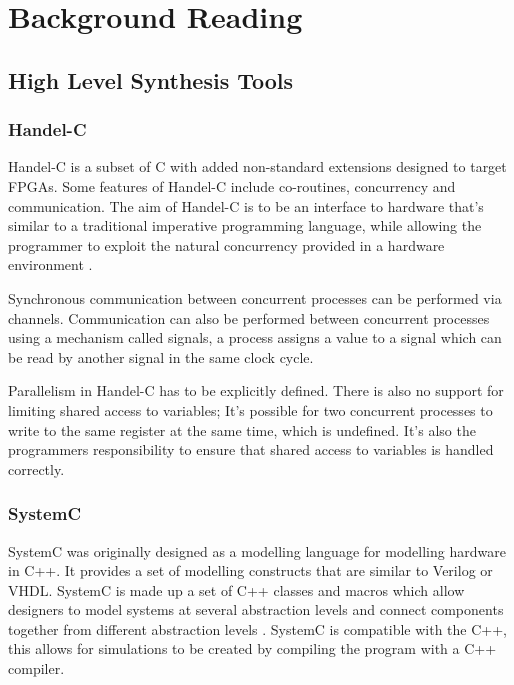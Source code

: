 \section{Background Reading}

\subsection{High Level Synthesis Tools}


\subsubsection{Handel-C}
Handel-C\cite{Handel-C} is a subset of C with added non-standard extensions designed
to target FPGAs. Some features of Handel-C include co-routines, concurrency and communication.
The aim of Handel-C is to be an interface to hardware that's similar to a traditional imperative
programming language, while allowing the programmer to exploit the natural concurrency provided in a 
hardware environment \cite{Handel-C2}. 

Synchronous communication between concurrent processes can be performed 
via channels. Communication can also be performed between concurrent processes using a mechanism called signals,
a process assigns a value to a signal which can be read by another signal in the same clock cycle.

Parallelism in Handel-C has to be explicitly defined. 
There is also no support for limiting shared access to variables; It's possible for two concurrent processes to write
to the same register at the same time, which is undefined. It's also the programmers responsibility to ensure that shared access 
to variables is handled correctly. 




\subsubsection{SystemC}
SystemC\cite{systemc} was originally designed as a modelling language for modelling hardware in
C++. It provides a set of modelling constructs that are similar to Verilog or VHDL.
SystemC is made up a set of C++ classes and macros which allow designers to model
systems at several abstraction levels and connect components together from different 
abstraction levels \cite{systemc2}. SystemC is compatible with the C++, this allows for 
simulations to be created by compiling the program with a C++ compiler.

